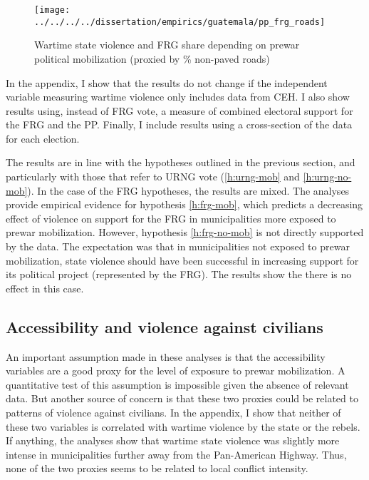 \documentclass[12pt, notitlepage]{article}
\begin{document}
\begin{figure*}[htb!]
  \centering
    \texttt{[image: ../../../../dissertation/empirics/guatemala/pp\_frg\_roads]}

  \caption{Wartime state violence and FRG share depending on prewar political mobilization (proxied by \% non-paved roads)} \label{fig:pp_frg_roads}


\end{figure*}

In the appendix, I show that the results do not change if the independent variable measuring wartime violence only includes data from CEH.
I also show results using, instead of FRG vote, a measure of combined electoral support for the FRG and the PP.
Finally, I include results using a cross-section of the data for each election.

The results are in line with the hypotheses outlined in the previous section, and particularly with those that refer to URNG vote (\ref{h:urng-mob} and \ref{h:urng-no-mob}).
In the case of the FRG hypotheses, the results are mixed.
The analyses provide empirical evidence for hypothesis \ref{h:frg-mob}, which predicts a decreasing effect of violence on support for the FRG in municipalities more exposed to prewar mobilization.
However, hypothesis \ref{h:frg-no-mob} is not directly supported by the data.
The expectation was that in municipalities not exposed to prewar mobilization, state violence should have been successful in increasing support for its political project (represented by the FRG).
The results show the there is no effect in this case.

\subsection*{Accessibility and violence against civilians}

An important assumption made in these analyses is that the accessibility variables are a good proxy for the level of exposure to prewar mobilization.
A quantitative test of this assumption is impossible given the absence of relevant data.
But another source of concern is that these two proxies could be related to patterns of violence against civilians.
In the appendix, I show that neither of these two variables is correlated with wartime violence by the state or the rebels.
If anything, the analyses show that wartime state violence was slightly more intense in municipalities further away from the Pan-American Highway.
Thus, none of the two proxies seems to be related to local conflict intensity.
\end{document}
